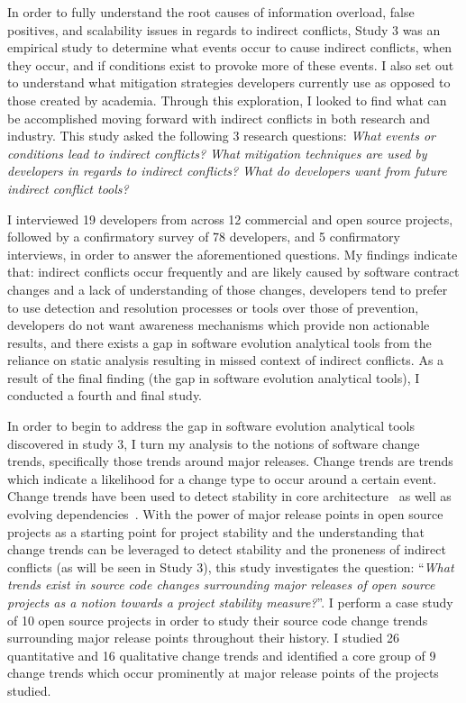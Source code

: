 
In order to fully understand the root causes of information overload, false positives, and
scalability issues in regards to indirect conflicts, Study 3 was an empirical study to determine what events occur to
cause indirect conflicts, when they occur, and if conditions exist to provoke more of these events. 
I also set out to understand what mitigation strategies developers currently use as opposed to those created
by academia. Through this exploration, I looked to find what can be accomplished moving forward with indirect conflicts
in both research and industry. This study asked the following 3 research questions: 
\textit{What events or conditions lead to indirect conflicts?}
\textit{What mitigation techniques are used by developers in regards to indirect conflicts?}
\textit{What do developers want from future indirect conflict tools?}

 I interviewed 19 developers from across 12 commercial and open source projects, followed by a confirmatory survey of 78 
developers, and 5 confirmatory interviews, in order to answer the aforementioned questions. My findings indicate that: 
indirect conflicts occur frequently and are likely caused by software contract changes and a lack of understanding of those changes,
developers tend to prefer to use detection and resolution processes or tools
over those of prevention, developers do not want awareness mechanisms which provide non actionable results, 
and there exists a gap in software evolution analytical tools from the reliance on static analysis resulting in missed
context of indirect conflicts. As a result of the final finding (the gap in software evolution analytical tools), I conducted
a fourth and final study.

In order to begin to address the gap in software evolution analytical tools discovered in study 3, I turn my analysis to the notions 
of software change trends, specifically those trends around major releases. Change trends are trends which indicate
a likelihood for a change type to occur around a certain event. Change trends have been used to detect
stability in core architecture~\cite{Wermelinger:2008:AEE} as well as evolving dependencies~\cite{Businge:2010:ESE}.
With the power of major release points in open source projects as a starting point for project stability and the understanding that change trends can
be leveraged to detect stability and the proneness of indirect conflicts (as will be seen in Study 3), this study investigates the question:
``\textit{What trends exist in source code changes surrounding major releases of open source projects as a notion towards a project
stability measure?}''. I perform a case study of 10 open source projects in order to study their source code change trends surrounding major release points
throughout their history. I studied 26 quantitative and 16 qualitative change trends and identified a core group of 9 change trends which occur
prominently at major release points of the projects studied.

